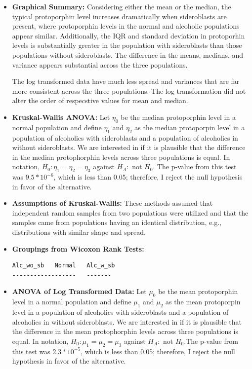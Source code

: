 \documentclass{article}\usepackage[]{graphicx}\usepackage[]{color}
\begin{document}
\begin{itemize}
\item \textbf{Graphical Summary:}  Considering either the mean or the median, the typical
protoporphin level increases dramatically when sideroblasts are present, where protoporphin
levels in the normal and alcoholic populations appear similar.  Additionally, the IQR and
standard deviation in protoporhin levels is substantially greater in the population with
sideroblasts than those populations without sideroblasts.  The difference in the means,
medians, and variance appears substantial across the three populations.\

The log transformed data have much less spread and variances that are far more consistent
across the three populations.  The log transformation did not alter the order of
respecstive values for mean and median.


\item \textbf{Kruskal-Wallis ANOVA:} Let $\eta_0$ be the median protoporphin level in a
normal population and define $\eta_1$ and $\eta_2$ as the median protoporpin level in a
population of alcoholics with sideroblasts and a population of alcoholics in without
sideroblasts.  We are interested in if it is plausible that the
difference in the median protophorphin levels across three populations is equal.  In notation,
$H_0: \eta_1 = \eta_2 = \eta_3 $ against $H_A:$ not $H_0$.
The p-value from this test was $9.5*10^{-6}$, which is less than 0.05; therefore, I reject
the null hypothesis in favor of the alternative.


\item \textbf{Assumptions of Kruskal-Wallis:} These methods assumed that independent random samples from
two populations were utilized and that the samples came from populations having
an identical distribution, e.g., distributions with similar shape and spread.

\item \textbf{Groupings from Wicoxon Rank Tests:}
\begin{verbatim}
Alc_wo_sb   Normal   Alc_w_sb
------------------   -------
\end{verbatim}

\item \textbf{ANOVA of Log Transformed Data:} Let $\mu_0$ be the mean protoporphin level in a
normal population and define $\mu_1$ and $\mu_2$ as the mean protoporpin level in a
population of alcoholics with sideroblasts and a population of alcoholics in without
sideroblasts.  We are interested in if it is plausible that the
difference in the mean protophorphin levels across three populations is equal.  In notation,
$H_0: \mu_1 = \mu_2 = \mu_3 $ against $H_A:$ not $H_0$.The p-value from this test was
$2.3*10^{-5}$, which is less than 0.05; therefore, I reject
the null hypothesis in favor of the alternative.


\end{itemize}
\end{document}
